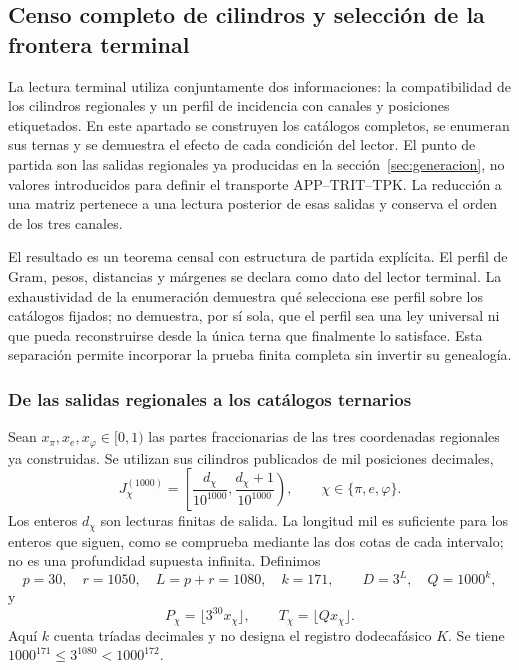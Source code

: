 \subsection{Censo completo de cilindros y selección de la frontera terminal}
\label{censo:terminal-completo}

La lectura terminal utiliza conjuntamente dos informaciones: la compatibilidad
de los cilindros regionales y un perfil de incidencia con canales y posiciones
etiquetados. En este apartado se construyen los catálogos completos, se
enumeran sus ternas y se demuestra el efecto de cada condición del lector.
El punto de partida son las salidas regionales ya producidas en la
sección~\ref{sec:generacion}, no valores introducidos para definir el
transporte APP--TRIT--TPK. La reducción a una matriz pertenece a una lectura
posterior de esas salidas y conserva el orden de los tres canales.

El resultado es un teorema censal con estructura de partida explícita.
El perfil de Gram, pesos, distancias y márgenes se declara como dato del
lector terminal. La exhaustividad de la enumeración demuestra qué selecciona
ese perfil sobre los catálogos fijados; no demuestra, por sí sola, que el
perfil sea una ley universal ni que pueda reconstruirse desde la única terna
que finalmente lo satisface. Esta separación permite incorporar la prueba
finita completa sin invertir su genealogía.

\subsubsection{De las salidas regionales a los catálogos ternarios}

Sean \(x_\pi,x_e,x_\varphi\in[0,1)\) las partes fraccionarias de las
tres coordenadas regionales ya construidas. Se utilizan sus cilindros
publicados de mil posiciones decimales,
\[
 J_\chi^{(1000)}=
 \left[\frac{d_\chi}{10^{1000}},
       \frac{d_\chi+1}{10^{1000}}\right),
 \qquad \chi\in\{\pi,e,\varphi\}.
\]
Los enteros \(d_\chi\) son lecturas finitas de salida. La longitud mil
es suficiente para los enteros que siguen, como se comprueba mediante las
dos cotas de cada intervalo; no es una profundidad supuesta infinita.
Definimos
\begin{equation}
 p=30,\quad r=1050,\quad L=p+r=1080,\quad k=171,
 \qquad D=3^L,\quad Q=1000^k,
 \label{censo:parametros}
\end{equation}
y
\[
 P_\chi=\lfloor3^{30}x_\chi\rfloor,\qquad
 T_\chi=\lfloor Qx_\chi\rfloor.
\]
Aquí \(k\) cuenta tríadas decimales y no designa el registro dodecafásico
\(K\). Se tiene \(1000^{171}\leq3^{1080}<1000^{172}\).

